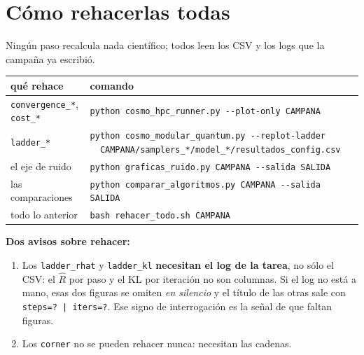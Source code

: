 \documentclass[11pt,a4paper]{article}
\begin{document}
\section{Cómo rehacerlas todas}

Ningún paso recalcula nada científico; todos leen los CSV y los logs que la
campaña ya escribió.

\begin{center}
\small
\begin{tabular}{@{}>{\raggedright\arraybackslash}p{6.0cm}>{\raggedright\arraybackslash}p{9.4cm}@{}}
\toprule
\textbf{qué rehace} & \textbf{comando} \\
\midrule
\texttt{convergence\_*}, \texttt{cost\_*}
  & \texttt{python cosmo\_hpc\_runner.py -{}-plot-only CAMPANA} \\
\texttt{ladder\_*}
  & \texttt{python cosmo\_modular\_quantum.py -{}-replot-ladder}\newline
    \texttt{\ \ CAMPANA/samplers\_*/model\_*/resultados\_config.csv} \\
el eje de ruido
  & \texttt{python graficas\_ruido.py CAMPANA -{}-salida SALIDA} \\
las comparaciones
  & \texttt{python comparar\_algoritmos.py CAMPANA -{}-salida SALIDA} \\
todo lo anterior
  & \texttt{bash rehacer\_todo.sh CAMPANA} \\
\bottomrule
\end{tabular}
\end{center}

\noindent
\textbf{Dos avisos sobre rehacer:}

\begin{enumerate}[leftmargin=1.6em]
  \item Los \texttt{ladder\_rhat} y \texttt{ladder\_kl} \textbf{necesitan el
    log de la tarea}, no sólo el CSV: el $\hat{R}$ por paso y el KL por
    iteración no son columnas. Si el log no está a mano, esas dos figuras se
    omiten \emph{en silencio} y el título de las otras sale con
    \texttt{steps=?~|~iters=?}. Ese signo de interrogación es la señal de que
    faltan figuras.
  \item Los \texttt{corner} no se pueden rehacer nunca: necesitan las cadenas.
\end{enumerate}

\end{document}

